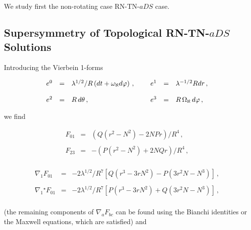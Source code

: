 \documentclass[12pt,a4paper]{article}
\begin{document}
We study first the non-rotating case RN-TN-$aDS$ case.


\subsection{Supersymmetry of Topological RN-TN-$aDS$ Solutions}


Introducing the Vierbein 1-forms

\begin{equation}
\begin{array}{rclrcl}
e^{0} & = & \lambda^{1/2}/R\left( dt +\omega_{\aleph}d\varphi \right)\, ,
\hspace{.5cm} & 
e^{1} & = & \lambda^{-1/2} Rdr \, , \\
& & & & & \\
e^{2} & = & R\, d\theta\, , & 
e^{3} & = &  R\, \Omega_{\aleph}\, d\varphi \, ,\\
\end{array}
\end{equation}

\noindent we find

\begin{equation}
\begin{array}{rcl}
F_{01} & = & \left(Q(r^2 -N^2 )-2NP r\right)/R^{4} \, , \\
& &  \\
F_{23} & = & -\left(P(r^2 -N^2 ) + 2NQ r\right)/R^{4} \, ,\\
\end{array}
\end{equation}

\begin{equation}
\begin{array}{rcl}
\nabla_{1}F_{01} & = & -2\lambda^{1/2}/ R^{7} \left[ Q(r^{3}-3rN^{2})
-P(3r^{2}N -N^{3})\right]\, ,\\
& & \\
\nabla_{1}{}^{\star}F_{01} & = & -2\lambda^{1/2}/ R^{7} \left[ P(r^{3}-3rN^{2})
+Q(3r^{2}N -N^{3})\right]\, ,\\
\end{array}
\end{equation}

\noindent (the remaining components of $\nabla_{a}F_{bc}$ can be
found using the Bianchi identities or the Maxwell equations, which are
satisfied) and
\end{document}
